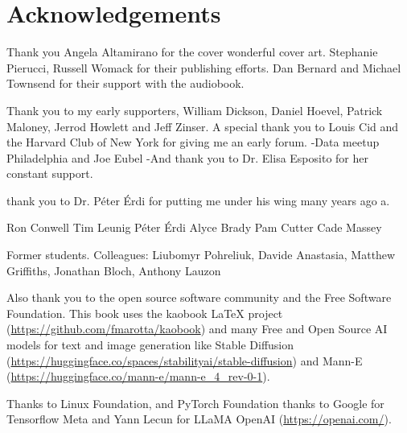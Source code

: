 \let\cleardoublepage\clearpage
\chapter*{Acknowledgements}

Thank you Angela Altamirano for the cover wonderful cover art. Stephanie Pierucci, Russell Womack for their publishing efforts. Dan Bernard and Michael Townsend for their support with the audiobook. 

Thank you to my early supporters, William Dickson, Daniel Hoevel, Patrick Maloney, Jerrod Howlett and Jeff Zinser. A special thank you to Louis Cid and the Harvard Club of New York for giving me an early forum. 
-Data meetup Philadelphia and Joe Eubel
-And thank you to Dr. Elisa Esposito for her constant support. 

thank you to Dr. Péter Érdi for putting me under his wing many years ago a.

Ron Conwell
Tim Leunig
Péter Érdi
Alyce Brady
Pam Cutter
Cade Massey

Former students.
Colleagues: Liubomyr Pohreliuk, Davide Anastasia, Matthew Griffiths, Jonathan Bloch, Anthony Lauzon

Also thank you to the open source software community and the Free Software Foundation. This book uses the kaobook LaTeX project (\url{https://github.com/fmarotta/kaobook}) and  many Free and Open Source AI  models for text and image generation like Stable Diffusion (\url{https://huggingface.co/spaces/stabilityai/stable-diffusion}) and Mann-E (\url{https://huggingface.co/mann-e/mann-e_4_rev-0-1}). 

Thanks to Linux Foundation, and PyTorch Foundation thanks to Google for Tensorflow
Meta and Yann Lecun for LLaMA
OpenAI (\url{https://openai.com/}).

